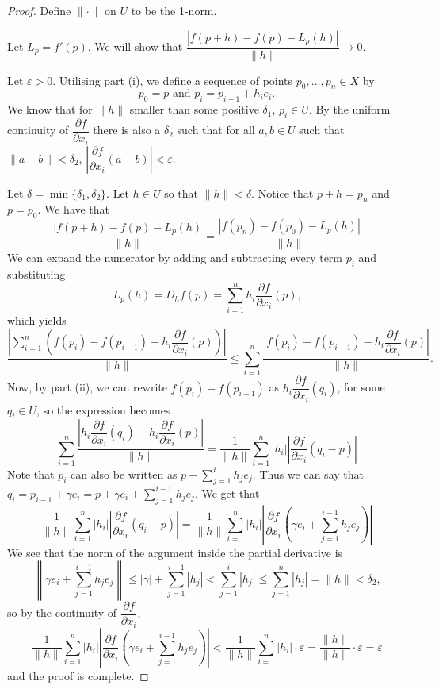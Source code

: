 \documentclass{article}
\theoremstyle{plain} %
\numberwithin{thm}{section} %
\theoremstyle{definition}
\begin{document}
    \begin{proof}
        Define \(\|\cdot\|\) on \(U\) to be the 1-norm.

        Let \(L_p = f'(p)\). We will show that \(\dfrac{|f(p+h) - f(p) - L_p(h)|}{\|h\|} \to 0\).

        Let \(\varepsilon > 0\). Utilising part (i), we define a sequence of points \(p_0, ..., p_n \in X\) by
        \[
            p_0 = p \text{ and } p_i = p_{i-1} + h_i e_i \text{.} 
        \]
        We know that for \(\|h\|\) smaller than some positive \(\delta _1\), \(p_i \in U\). By the uniform continuity of \(\dfrac{\partial f}{\partial x_i}\) there is also a \(\delta _2\) such that for all \(a,b \in U\) such that \(\|a-b\| <\delta _2\), \(\left\vert\dfrac{\partial f}{\partial x_i} (a-b)\right\vert < \varepsilon\).

        Let \(\delta = \min \{\delta _1, \delta _2 \}\). Let \(h \in U\) so that \(\|h\| < \delta\). Notice that \(p+h = p_n\) and \(p = p_0\). We have that
        \[
            \frac{|f(p+h) - f(p) - L_p(h)}{\|h\|} = \frac{|f(p_n) - f(p_0) - L_p(h)|}{\|h\|}
        \]
        We can expand the numerator by adding and subtracting every term \(p_i\) and substituting
        \[
            L_p(h) = D_h f (p) = \sum_{i=1}^n h_i \dfrac{\partial f}{\partial x_i}(p) \text{,} 
        \]
        which yields
        \[
            \frac{\left\vert \sum\limits_{i=1}^n \left(f(p_i) - f(p_{i-1}) - h_i\dfrac{\partial f}{\partial x_i}(p) \right)\right\vert}{\|h\|} \leq \sum_{i=1}^n \frac{\left\vert f(p_i) - f(p_{i-1}) - h_i \dfrac{\partial f}{\partial x_i} (p) \right\vert }{\|h\|} \text{.} 
        \]
        Now, by part (ii), we can rewrite \(f(p_i) - f(p_{i-1})\) as \(h_i \dfrac{\partial f}{\partial x_i} (q_i)\), for some \(q_i \in U\), so the expression becomes
        \[
            \sum_{i=1}^n \frac{\left\vert h_i \dfrac{\partial f}{\partial x_i} (q_i) - h_i \dfrac{\partial f}{\partial x_i} (p) \right\vert}{\|h\|} = \frac{1}{\|h\|}\sum_{i=1}^n |h_i| \left\vert\dfrac{\partial f}{\partial x_i} (q_i - p)\right\vert
        \]
        Note that \(p_i\) can also be written as \(p + \sum_{j=1}^i h_j e_j\). Thus we can say that \(q_i = p_{i-1} + \gamma e_i = p + \gamma e_i + \sum_{j=1}^{i-1} h_j e_j\). We get that
        \[
            \frac{1}{\|h\|}\sum_{i=1}^n |h_i| \left\vert\dfrac{\partial f}{\partial x_i} (q_i - p)\right\vert = \frac{1}{\|h\|}\sum_{i=1}^n |h_i| \left\vert\dfrac{\partial f}{\partial x_i} \left(\gamma e_i + \sum_{j=1}^{i-1} h_j e_j\right)\right\vert
        \]
        We see that the norm of the argument inside the partial derivative is
        \[
            \left\lVert \gamma e_i + \sum_{j=1}^{i-1} h_j e_j \right\rVert \leq |\gamma| + \sum_{j=1}^{i-1} |h_j| < \sum_{j=1}^i |h_j| \leq \sum_{j=1}^n |h_j| = \|h\| < \delta _2 \text{,} 
        \]
        so by the continuity of \(\dfrac{\partial f}{\partial x_i}\),
        \[
            \frac{1}{\|h\|}\sum_{i=1}^n |h_i| \left\vert\dfrac{\partial f}{\partial x_i} \left(\gamma e_i + \sum_{j=1}^{i-1} h_j e_j\right)\right\vert < \frac{1}{\|h\|}\sum_{i=1}^n |h_i| \cdot \varepsilon = \frac{\|h\|}{\|h\|} \cdot \varepsilon = \varepsilon
        \]
        and the proof is complete.

    \end{proof}
\end{document}
